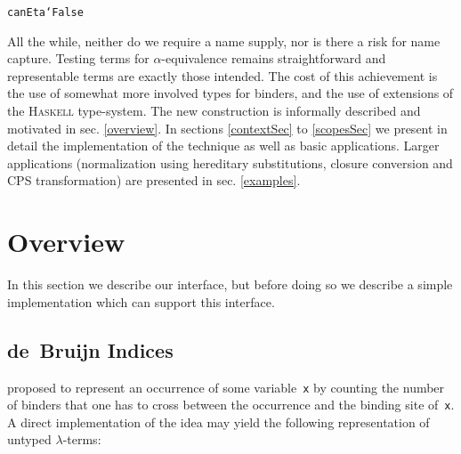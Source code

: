 \documentclass[9pt,preprint,authoryear]{sigplanconf}
\begin{document}
{{{}\vphantom{$\{$}}}\textcolor[rgb]{0,0,0.80}{\texttt{canEta}}\textcolor[rgb]{0,0,0.80}{\texttt{\mbox{\hspace{0.50em}}}}\textcolor[rgb]{0,0,0.80}{\texttt{\makebox[1.22ex][c]{\_{}}}}\textcolor[rgb]{0,0,0.80}{\texttt{\mbox{\hspace{0.50em}}}}\textcolor[cmyk]{0,0.65,0.99,0}{\texttt{{\char `\=}}}\textcolor[rgb]{0,0,0.80}{\texttt{\mbox{\hspace{0.50em}}}}\textcolor[rgb]{0.70,0.13,0.13}{\texttt{False}}\textcolor[rgb]{0,0,0.80}{\texttt{{\nopagebreak \newline%
}\vphantom{$\{$}}}%


%
%


%
All the while, neither do we require a
    name supply, nor is there a risk for name capture.
    Testing terms for $ \alpha $-equivalence remains straightforward and representable
    terms are exactly those intended.
    The cost of this
    achievement is the use of somewhat more involved types for binders,
    and the use of extensions of the \textsc{Haskell} type-system. 
    The new construction is informally described and
    motivated in sec. \ref{overview}. In sections \ref{contextSec} to \ref{scopesSec}    we present in detail the implementation of the technique as well
    as basic applications.
    Larger applications (normalization using hereditary substitutions, closure conversion and
    CPS transformation) are presented in sec. \ref{examples}.


\section{Overview\label{overview}}

%
In this section we describe our interface, but before doing so we 
    describe a simple implementation which can support this interface.%


\subsection{de{~}Bruijn Indices}

%
 proposed to represent an occurrence of
    some variable{~}\textcolor[rgb]{0,0,0.80}{\texttt{x}} by counting the number of binders that one
    has to cross between the occurrence and the binding site of{~}\textcolor[rgb]{0,0,0.80}{\texttt{x}}.
    A direct implementation of the idea may yield the following
    representation of untyped $ \lambda $-terms{:}%
\end{document}
